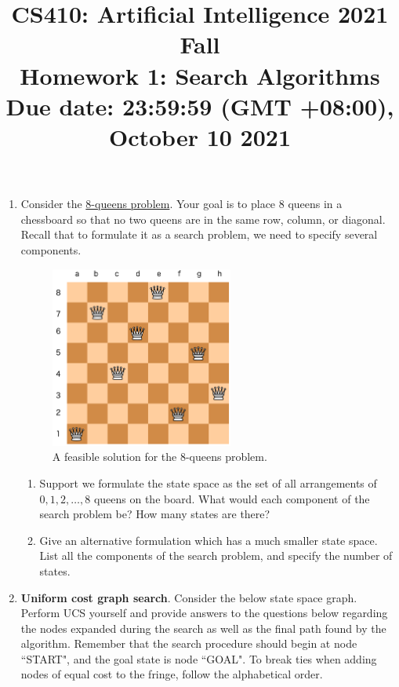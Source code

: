\documentclass{article}
\title{\normalsize
CS410: Artificial Intelligence 2021 Fall\\
Homework 1: Search Algorithms\\
Due date: 23:59:59 (GMT +08:00), October 10 2021}
\author{}
\date{}
\begin{document}
 
\maketitle

\begin{enumerate}
    \item %
        Consider the \href{https://en.wikipedia.org/wiki/Eight_queens_puzzle}{8-queens problem}.
    Your goal is to place 8 queens in a chessboard so that no two
    queens are in the same row, column, or diagonal.
    Recall that to formulate it as a search problem, we need to specify several components.
    
    \begin{figure}[h]
        \centering
        \includegraphics[width=6cm]{figs/eight_queens.png}
        \caption{A feasible solution for the 8-queens problem.}
    \end{figure}
    
    \begin{enumerate}
        \item Support we formulate the state space as the set of all arrangements of $0, 1, 2, \dots, 8$ queens on the board.
        What would each component of the search problem be?
        How many states are there?
        
        \item Give an alternative formulation which has a much smaller state space.
        List all the components of the search problem, and specify the number of states.
    \end{enumerate}

    \clearpage
    \item %
    \textbf{Uniform cost graph search}.
    Consider the below state space graph.
    Perform UCS yourself and provide answers to the questions below regarding the nodes expanded during the search as well as the final path found by the algorithm.
    Remember that the search procedure should begin at node ``START", and the goal state is node ``GOAL".
    To break ties when adding nodes of equal cost to the fringe, follow the alphabetical order.
    

\end{enumerate}
\end{document}
